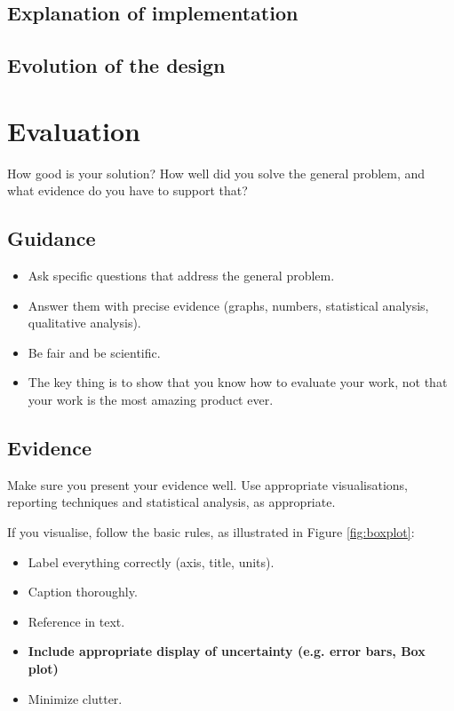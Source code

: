 \documentclass{l4proj}
\begin{document}
\section{Explanation of implementation}

\section{Evolution of the design}


\chapter{Evaluation} 
How good is your solution? How well did you solve the general problem, and what evidence do you have to support that?

\section{Guidance}
\begin{itemize}
    \item
        Ask specific questions that address the general problem.
    \item
        Answer them with precise evidence (graphs, numbers, statistical
        analysis, qualitative analysis).
    \item
        Be fair and be scientific.
    \item
        The key thing is to show that you know how to evaluate your work, not
        that your work is the most amazing product ever.
\end{itemize}

\section{Evidence}
Make sure you present your evidence well. Use appropriate visualisations, reporting techniques and statistical analysis, as appropriate.

If you visualise, follow the basic rules, as illustrated in Figure \ref{fig:boxplot}:
\begin{itemize}
\item Label everything correctly (axis, title, units).
\item Caption thoroughly.
\item Reference in text.
\item \textbf{Include appropriate display of uncertainty (e.g. error bars, Box plot)}
\item Minimize clutter.
\end{itemize}
\end{document}
